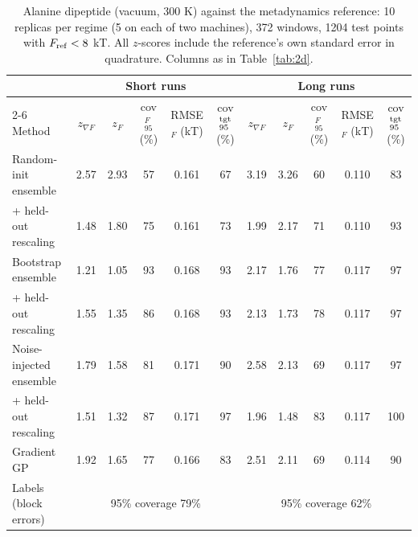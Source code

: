 \begin{table}
\caption{Alanine dipeptide (vacuum, 300 K) against the metadynamics reference: 10 replicas per regime (5 on each of two machines), 372 windows, 1204 test points with $F_{\rm ref}<8$ kT. All $z$-scores include the reference's own standard error in quadrature. Columns as in Table~\ref{tab:2d}.}
\label{tab:ala2}
\begin{ruledtabular}
\begin{tabular}{lcccccccccc}
 & \multicolumn{5}{c}{Short runs} & \multicolumn{5}{c}{Long runs} \\
\cline{2-6}\cline{7-11}
Method & $z_{\nabla F}$ & $z_F$ & cov$_{95}^F$ (\%) & RMSE$_F$ (kT) & cov$_{95}^{\rm tgt}$ (\%) & $z_{\nabla F}$ & $z_F$ & cov$_{95}^F$ (\%) & RMSE$_F$ (kT) & cov$_{95}^{\rm tgt}$ (\%) \\
\hline
Random-init ensemble & 2.57 & 2.93 & 57 & 0.161 & 67 & 3.19 & 3.26 & 60 & 0.110 & 83 \\
\quad + held-out rescaling & 1.48 & 1.80 & 75 & 0.161 & 73 & 1.99 & 2.17 & 71 & 0.110 & 93 \\
Bootstrap ensemble & 1.21 & 1.05 & 93 & 0.168 & 93 & 2.17 & 1.76 & 77 & 0.117 & 97 \\
\quad + held-out rescaling & 1.55 & 1.35 & 86 & 0.168 & 93 & 2.13 & 1.73 & 78 & 0.117 & 97 \\
Noise-injected ensemble & 1.79 & 1.58 & 81 & 0.171 & 90 & 2.58 & 2.13 & 69 & 0.117 & 97 \\
\quad + held-out rescaling & 1.51 & 1.32 & 87 & 0.171 & 97 & 1.96 & 1.48 & 83 & 0.117 & 100 \\
Gradient GP & 1.92 & 1.65 & 77 & 0.166 & 83 & 2.51 & 2.11 & 69 & 0.114 & 90 \\
\hline
Labels (block errors) & \multicolumn{5}{c}{95\% coverage 79\%} & \multicolumn{5}{c}{95\% coverage 62\%} \\
\end{tabular}
\end{ruledtabular}
\end{table}

